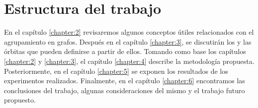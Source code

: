 \section{Estructura del trabajo}

En el capítulo \ref{chapter:2} revisaremos algunos conceptos útiles relacionados con el agrupamiento en grafos. Después en el capítulo \ref{chapter:3}, se discutirán los \graphlets  y las órbitas que pueden definirse a partir de ellos. Tomando como base los capítulos \ref{chapter:2} y \ref{chapter:3}, el capítulo \ref{chapter:4} describe la metodología propuesta. Posteriormente, en el capítulo \ref{chapter:5} se exponen los resultados de los experimentos realizados. Finalmente, en el capítulo \ref{chapter:6} encontramos las conclusiones del trabajo, algunas consideraciones del mismo y el trabajo futuro propuesto.